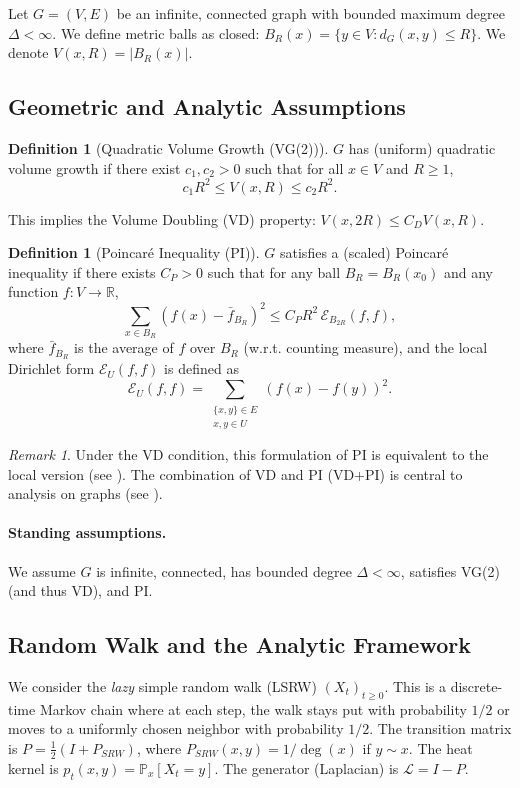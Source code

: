 \documentclass{article}
\numberwithin{equation}{section}
\theoremstyle{definition}
\newtheorem{definition}[theorem]{Definition}
\theoremstyle{remark}
\newtheorem{remark}[theorem]{Remark}
\newcommand{\cE}{\mathcal{E}}
\newcommand{\LL}{\mathcal{L}}
\newcommand{\R}{\mathbb{R}}
\newcommand{\Prob}{\mathbb{P}}
\begin{document}
Let $G = (V,E)$ be an infinite, connected graph with bounded maximum degree $\Delta < \infty$. We define metric balls as closed: $B_R(x) = \{y \in V : d_G(x,y) \leq R\}$. We denote $V(x,R) = |B_R(x)|$.

\subsection{Geometric and Analytic Assumptions}

\begin{definition}[Quadratic Volume Growth (VG(2))]
$G$ has (uniform) quadratic volume growth if there exist $c_1, c_2 > 0$ such that for all $x \in V$ and $R \geq 1$,
\begin{equation}\label{eq:quad}
c_1 R^{2} \leq V(x,R) \leq c_2 R^{2}.
\end{equation}
\end{definition}
This implies the Volume Doubling (VD) property: $V(x,2R) \leq C_D V(x,R)$.

\begin{definition}[Poincaré Inequality (PI)]\label{def:PI}
$G$ satisfies a (scaled) Poincaré inequality if there exists $C_P > 0$ such that for any ball $B_R=B_R(x_0)$ and any function $f: V \to \R$,
\[
\sum_{x \in B_R} (f(x) - \bar{f}_{B_R})^2 \leq C_P R^2 \, \cE_{B_{2R}}(f,f),
\]
where $\bar{f}_{B_R}$ is the average of $f$ over $B_R$ (w.r.t. counting measure), and the local Dirichlet form $\cE_U(f,f)$ is defined as
\[
\cE_U(f,f) = \sum_{\substack{\{x,y\} \in E \\ x,y \in U}} (f(x)-f(y))^2.
\]
\end{definition}

\begin{remark}\label{rem:PI_equivalence}
Under the VD condition, this formulation of PI is equivalent to the local version (see \cite{HajlaszKoskela00}). The combination of VD and PI (VD+PI) is central to analysis on graphs (see \cite{GrigoryanTelcs12}).
\end{remark}

\paragraph{Standing assumptions.} We assume $G$ is infinite, connected, has bounded degree $\Delta < \infty$, satisfies VG(2) (and thus VD), and PI.

\subsection{Random Walk and the Analytic Framework}
We consider the \emph{lazy} simple random walk (LSRW) $(X_t)_{t \geq 0}$. This is a discrete-time Markov chain where at each step, the walk stays put with probability $1/2$ or moves to a uniformly chosen neighbor with probability $1/2$. The transition matrix is $P = \frac{1}{2}(I + P_{SRW})$, where $P_{SRW}(x,y) = 1/\deg(x)$ if $y \sim x$. The heat kernel is $p_t(x,y) = \Prob_x[X_t = y]$. The generator (Laplacian) is $\LL = I - P$.
\end{document}

